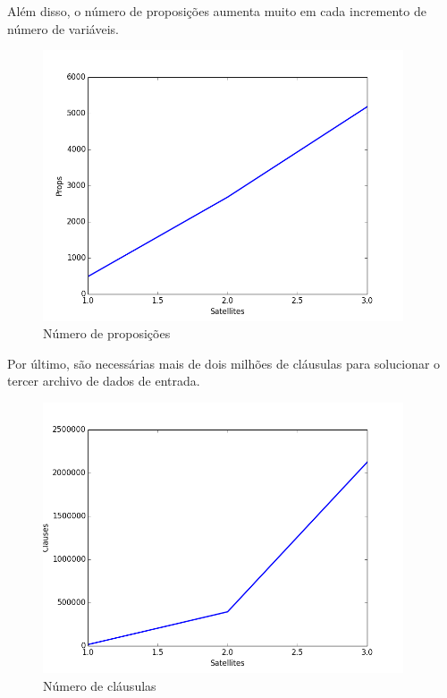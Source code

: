 	Além disso, o número de proposições aumenta muito em cada incremento de número de variáveis.
		\begin{figure}[H]
			\centering
			\includegraphics[height=8cm]{images/satellites-props}
			\caption{Número de proposições}
			\label{fig:satprops}
		\end{figure}
	Por último, são necessárias mais de dois milhões de cláusulas para solucionar o tercer archivo de dados de entrada.
		\begin{figure}[H]
			\centering
			\includegraphics[height=8cm]{images/satellites-clauses}
			\caption{Número de cláusulas}
			\label{fig:satclauses}
		\end{figure}